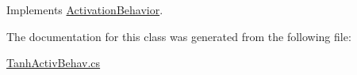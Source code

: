 Implements \mbox{\hyperlink{interface_activation_behavior_a6c7af51cf1b10eaadcbf086231e5539b}{Activation\+Behavior}}.



The documentation for this class was generated from the following file\+:\begin{DoxyCompactItemize}
\item 
\mbox{\hyperlink{_tanh_activ_behav_8cs}{Tanh\+Activ\+Behav.\+cs}}\end{DoxyCompactItemize}
